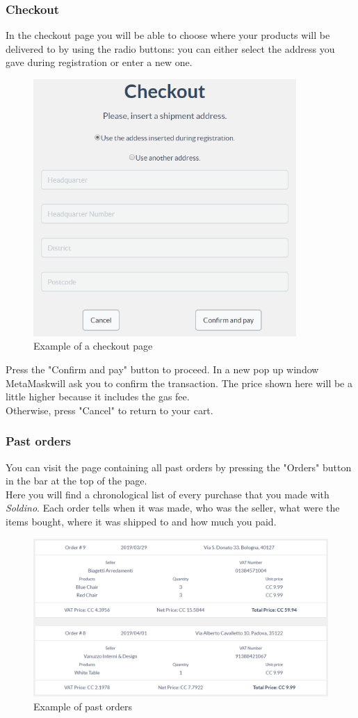 		\subsubsection{Checkout}
		In the checkout page you will be able to choose where your products 
		will be delivered to by using the radio buttons: you can either select 
		the address you gave during registration or enter a new one.
	\begin{figure}[H]
		\includegraphics[width=10cm]{res/images/checkout.png}
		\centering
		\caption{Example of a checkout page}
	\end{figure}
	\noindent Press the "Confirm and pay" button to proceed. In a new 
	pop up window MetaMask\glosp will ask you to confirm the transaction. The price 
	shown here will be a little higher because it includes the gas fee. \\
	Otherwise, press "Cancel" to return to your cart.
		\subsubsection{Past orders}
		You can visit the page containing all past orders by pressing the "Orders" 
		button in the bar at the top of the page.\\
	Here you will find a chronological list of every purchase that you made with 
	\textit{Soldino}. Each order tells when it was made, who was the seller, 
	what were the items bought, where it was shipped to and how much you paid.
	\begin{figure}[H]
		\includegraphics[width=15cm]{res/images/past_orders.png}
		\centering
		\caption{Example of past orders}
	\end{figure}
